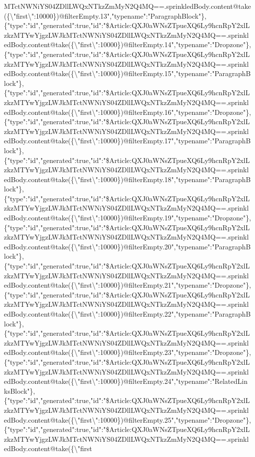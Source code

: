 MTctNWNiYS04ZDllLWQxNTkzZmMyN2Q4MQ==.sprinkledBody.content@take(\{\textbackslash{}"first\textbackslash{}":10000\})@filterEmpty.13","typename":"ParagraphBlock"\},\{"type":"id","generated":true,"id":"\$Article:QXJ0aWNsZTpueXQ6Ly9hcnRpY2xlLzkzMTYwYjgzLWJkMTctNWNiYS04ZDllLWQxNTkzZmMyN2Q4MQ==.sprinkledBody.content@take(\{\textbackslash{}"first\textbackslash{}":10000\})@filterEmpty.14","typename":"Dropzone"\},\{"type":"id","generated":true,"id":"\$Article:QXJ0aWNsZTpueXQ6Ly9hcnRpY2xlLzkzMTYwYjgzLWJkMTctNWNiYS04ZDllLWQxNTkzZmMyN2Q4MQ==.sprinkledBody.content@take(\{\textbackslash{}"first\textbackslash{}":10000\})@filterEmpty.15","typename":"ParagraphBlock"\},\{"type":"id","generated":true,"id":"\$Article:QXJ0aWNsZTpueXQ6Ly9hcnRpY2xlLzkzMTYwYjgzLWJkMTctNWNiYS04ZDllLWQxNTkzZmMyN2Q4MQ==.sprinkledBody.content@take(\{\textbackslash{}"first\textbackslash{}":10000\})@filterEmpty.16","typename":"Dropzone"\},\{"type":"id","generated":true,"id":"\$Article:QXJ0aWNsZTpueXQ6Ly9hcnRpY2xlLzkzMTYwYjgzLWJkMTctNWNiYS04ZDllLWQxNTkzZmMyN2Q4MQ==.sprinkledBody.content@take(\{\textbackslash{}"first\textbackslash{}":10000\})@filterEmpty.17","typename":"ParagraphBlock"\},\{"type":"id","generated":true,"id":"\$Article:QXJ0aWNsZTpueXQ6Ly9hcnRpY2xlLzkzMTYwYjgzLWJkMTctNWNiYS04ZDllLWQxNTkzZmMyN2Q4MQ==.sprinkledBody.content@take(\{\textbackslash{}"first\textbackslash{}":10000\})@filterEmpty.18","typename":"ParagraphBlock"\},\{"type":"id","generated":true,"id":"\$Article:QXJ0aWNsZTpueXQ6Ly9hcnRpY2xlLzkzMTYwYjgzLWJkMTctNWNiYS04ZDllLWQxNTkzZmMyN2Q4MQ==.sprinkledBody.content@take(\{\textbackslash{}"first\textbackslash{}":10000\})@filterEmpty.19","typename":"Dropzone"\},\{"type":"id","generated":true,"id":"\$Article:QXJ0aWNsZTpueXQ6Ly9hcnRpY2xlLzkzMTYwYjgzLWJkMTctNWNiYS04ZDllLWQxNTkzZmMyN2Q4MQ==.sprinkledBody.content@take(\{\textbackslash{}"first\textbackslash{}":10000\})@filterEmpty.20","typename":"ParagraphBlock"\},\{"type":"id","generated":true,"id":"\$Article:QXJ0aWNsZTpueXQ6Ly9hcnRpY2xlLzkzMTYwYjgzLWJkMTctNWNiYS04ZDllLWQxNTkzZmMyN2Q4MQ==.sprinkledBody.content@take(\{\textbackslash{}"first\textbackslash{}":10000\})@filterEmpty.21","typename":"Dropzone"\},\{"type":"id","generated":true,"id":"\$Article:QXJ0aWNsZTpueXQ6Ly9hcnRpY2xlLzkzMTYwYjgzLWJkMTctNWNiYS04ZDllLWQxNTkzZmMyN2Q4MQ==.sprinkledBody.content@take(\{\textbackslash{}"first\textbackslash{}":10000\})@filterEmpty.22","typename":"ParagraphBlock"\},\{"type":"id","generated":true,"id":"\$Article:QXJ0aWNsZTpueXQ6Ly9hcnRpY2xlLzkzMTYwYjgzLWJkMTctNWNiYS04ZDllLWQxNTkzZmMyN2Q4MQ==.sprinkledBody.content@take(\{\textbackslash{}"first\textbackslash{}":10000\})@filterEmpty.23","typename":"Dropzone"\},\{"type":"id","generated":true,"id":"\$Article:QXJ0aWNsZTpueXQ6Ly9hcnRpY2xlLzkzMTYwYjgzLWJkMTctNWNiYS04ZDllLWQxNTkzZmMyN2Q4MQ==.sprinkledBody.content@take(\{\textbackslash{}"first\textbackslash{}":10000\})@filterEmpty.24","typename":"RelatedLinksBlock"\},\{"type":"id","generated":true,"id":"\$Article:QXJ0aWNsZTpueXQ6Ly9hcnRpY2xlLzkzMTYwYjgzLWJkMTctNWNiYS04ZDllLWQxNTkzZmMyN2Q4MQ==.sprinkledBody.content@take(\{\textbackslash{}"first\textbackslash{}":10000\})@filterEmpty.25","typename":"Dropzone"\},\{"type":"id","generated":true,"id":"\$Article:QXJ0aWNsZTpueXQ6Ly9hcnRpY2xlLzkzMTYwYjgzLWJkMTctNWNiYS04ZDllLWQxNTkzZmMyN2Q4MQ==.sprinkledBody.content@take(\{\textbackslash{}"first\text